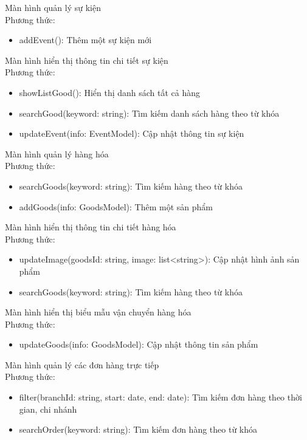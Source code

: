 Màn hình quản lý sự kiện\\
Phương thức:
\begin{itemize}
    \item addEvent(): Thêm một sự kiện mới
\end{itemize}
 
Màn hình hiển thị thông tin chi tiết sự kiện\\
Phương thức:
\begin{itemize}
    \item showListGood(): Hiển thị danh sách tất cả hàng
    \item searchGood(keyword: string): Tìm kiếm danh sách hàng theo từ khóa
    \item updateEvent(info: EventModel): Cập nhật thông tin sự kiện
\end{itemize}
 
Màn hình quản lý hàng hóa\\
Phương thức:
\begin{itemize}
    \item searchGoods(keyword: string): Tìm kiếm hàng theo từ khóa
    \item addGoods(info: GoodsModel): Thêm một sản phẩm
\end{itemize}
 
Màn hình hiển thị thông tin chi tiết hàng hóa\\
Phương thức:
\begin{itemize}
    \item updateImage(goodsId: string, image: list<string>): Cập nhật hình ảnh sản phẩm
    \item searchGoods(keyword: string): Tìm kiếm hàng theo từ khóa
\end{itemize}
 
Màn hình hiển thị biểu mẫu vận chuyển hàng hóa\\
Phương thức:
\begin{itemize}
    \item updateGoods(info: GoodsModel): Cập nhật thông tin sản phẩm
\end{itemize}
 
Màn hình quản lý các đơn hàng trực tiếp\\
Phương thức:
\begin{itemize}
    \item filter(branchId: string, start: date, end: date): Tìm kiếm đơn hàng theo thời gian, chi nhánh
    \item searchOrder(keyword: string): Tìm kiếm đơn hàng theo từ khóa
\end{itemize}
 
